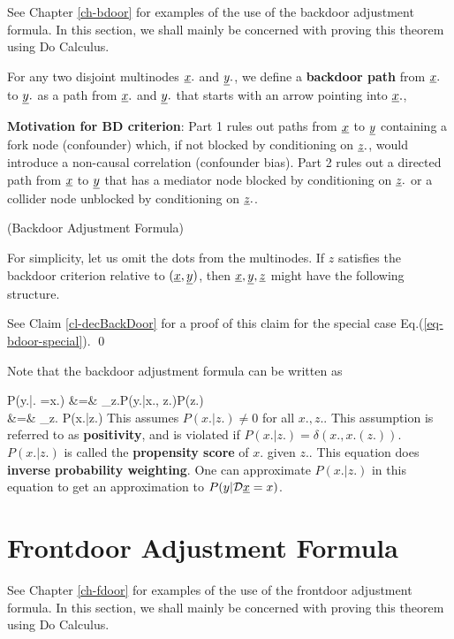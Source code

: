 See Chapter \ref{ch-bdoor}
for examples of the use of the
backdoor adjustment formula.
In this section,
we shall mainly be
concerned with
proving this
theorem
using Do Calculus.

For any two
disjoint
multinodes $\rvx.$
and $\rvy.$,
we define a {\bf backdoor path}
from $\rvx.$ to $\rvy.$
as a path from $\rvx.$
and $\rvy.$ that
starts with an arrow pointing into
$\rvx.$,

\bdoordef

{\bf Motivation for BD criterion}:
Part 1 rules out
paths
from $\rvx$
to $\rvy$
containing a fork node (confounder)
which, if not blocked by conditioning on $\rvz.$,
 would introduce a
non-causal correlation
(confounder bias).
Part 2 rules out
a directed path
from $\rvx$ to $\rvy$
that has a mediator node
blocked by conditioning on $\rvz.$
or a collider node
unblocked by conditioning on $\rvz.$.



\begin{claim} (Backdoor
Adjustment Formula)

\bdoorclaim
\end{claim}
\proof

For simplicity,
let us omit
the dots from the
multinodes.
If
$z$
satisfies the
backdoor
criterion
relative
to
$(\rvx, \rvy)$,
then
$\rvx, \rvy, \rvz$
might
have the following
structure.


\beq
{}
\label{eq-bdoor-special}
\eeq

See Claim \ref{cl-decBackDoor}
for a proof of this claim
for the
special case Eq.(\ref{eq-bdoor-special}).
\qed

Note that the backdoor adjustment  formula
can be written as

\beqa
P(y.|\cald \rvx. =x.)
&=&
\sum_{z.}P(y.|x., z.)P(z.)
\\
&=&
\sum_{z.}
{P(x.|z.)}
\eeqa
This assumes $P(x.|z.)\neq 0$
for all $x., z.$. This assumption
is referred to
as {\bf positivity},
and is violated
if $P(x.|z.)=\delta(x., x.(z.))$.
$P(x.|z.)$ is called the
{\bf propensity score}
of $x.$ given $z.$.
This
equation does
{\bf inverse probability weighting}.
One
can approximate $P(x.|z.)$
in this equation
to get
an approximation
to  $P(y|\cald\rvx=x)$.


\section{Frontdoor Adjustment Formula}
See Chapter \ref{ch-fdoor}
for examples of the use of the
frontdoor adjustment formula.
In this section,
we shall mainly be
concerned with
proving this
theorem
using Do Calculus.

